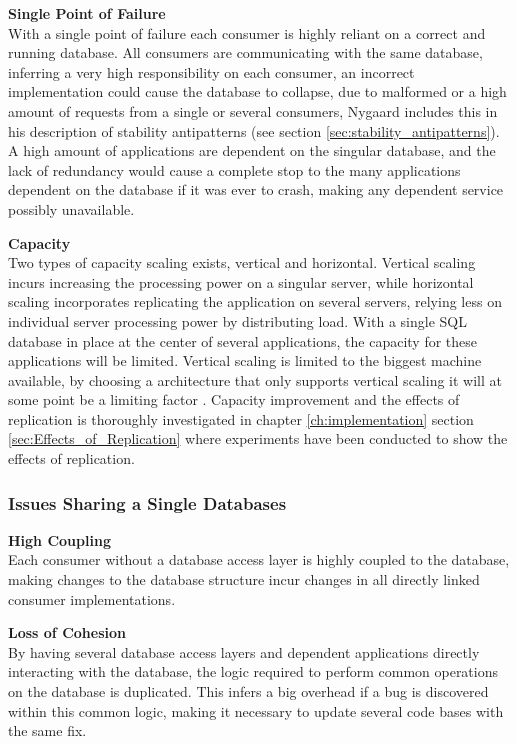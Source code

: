 {\textbf{Single Point of Failure}\\
With a single point of failure each consumer is highly reliant on a correct and running database. All consumers are communicating with the same database, inferring a very high responsibility on each consumer, an incorrect implementation could cause the database to collapse, due to malformed or a high amount of requests from a single or several consumers, Nygaard includes this in his description of stability antipatterns \cite[p. 31]{nygard2007release}  (see section \ref{sec:stability_antipatterns}).
A high amount of applications are dependent on the singular database, and the lack of redundancy would cause a complete stop to the many applications dependent on the database if it was ever to crash, making any dependent service possibly unavailable.

\textbf{Capacity}\\
Two types of capacity scaling exists, vertical and horizontal. Vertical scaling incurs increasing the processing power on a singular server, while horizontal scaling incorporates replicating the application on several servers, relying less on individual server processing power by distributing load. With a single SQL database in place at the center of several applications, the capacity for these applications will be limited. Vertical scaling is limited to the biggest machine available, by choosing a architecture that only supports vertical scaling it will at some point be a limiting factor \cite[t.~08:30]{meshenberg2016microservices}.
Capacity improvement and the effects of replication is thoroughly investigated in chapter \ref{ch:implementation} section \ref{sec:Effects_of_Replication} where experiments have been conducted to show the effects of replication.

\subsubsection{Issues Sharing a Single Databases}

\textbf{High Coupling}\\
Each consumer without a database access layer is highly coupled to the database, making changes to the database structure incur changes in all directly linked consumer implementations.

\textbf{Loss of Cohesion}\\
By having several database access layers and dependent applications directly interacting with the database, the logic required to perform common operations on the database is duplicated. This infers a big overhead if a bug is discovered within this common logic, making it necessary to update several code bases with the same fix.

}
